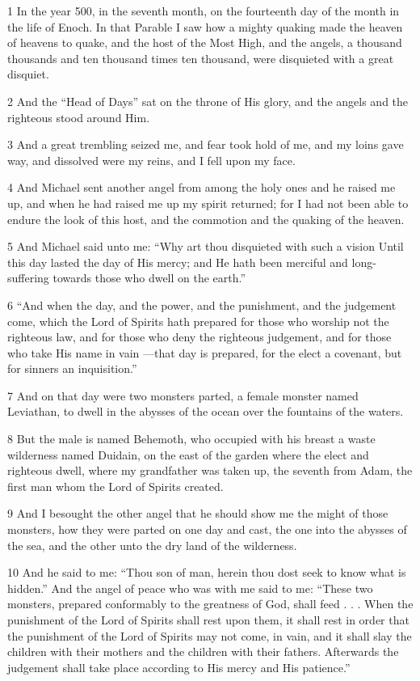 \par 1 In the year 500, in the seventh month, on the fourteenth day of the month in the life of Enoch. In that Parable I saw how a mighty quaking made the heaven of heavens to quake, and the host of the Most High, and the angels, a thousand thousands and ten thousand times ten thousand, were disquieted with a great disquiet.
\par 2 And the “Head of Days” sat on the throne of His glory, and the angels and the righteous stood around Him.
\par 3 And a great trembling seized me, and fear took hold of me, and my loins gave way, and dissolved were my reins, and I fell upon my face.
\par 4 And Michael sent another angel from among the holy ones and he raised me up, and when he had raised me up my spirit returned; for I had not been able to endure the look of this host, and the commotion and the quaking of the heaven.
\par 5 And Michael said unto me: “Why art thou disquieted with such a vision Until this day lasted the day of His mercy; and He hath been merciful and long-suffering towards those who dwell on the earth.”
\par 6 “And when the day, and the power, and the punishment, and the judgement come, which the Lord of Spirits hath prepared for those who worship not the righteous law, and for those who deny the righteous judgement, and for those who take His name in vain —that day is prepared, for the elect a covenant, but for sinners an inquisition.”
\par 7 And on that day were two monsters parted, a female monster named Leviathan, to dwell in the abysses of the ocean over the fountains of the waters.
\par 8 But the male is named Behemoth, who occupied with his breast a waste wilderness named Duidain, on the east of the garden where the elect and righteous dwell, where my grandfather was taken up, the seventh from Adam, the first man whom the Lord of Spirits created.
\par 9 And I besought the other angel that he should show me the might of those monsters, how they were parted on one day and cast, the one into the abysses of the sea, and the other unto the dry land of the wilderness.
\par 10 And he said to me: “Thou son of man, herein thou dost seek to know what is hidden.” And the angel of peace who was with me said to me: “These two monsters, prepared conformably to the greatness of God, shall feed . . . When the punishment of the Lord of Spirits shall rest upon them, it shall rest in order that the punishment of the Lord of Spirits may not come, in vain, and it shall slay the children with their mothers and the children with their fathers. Afterwards the judgement shall take place according to His mercy and His patience.”
